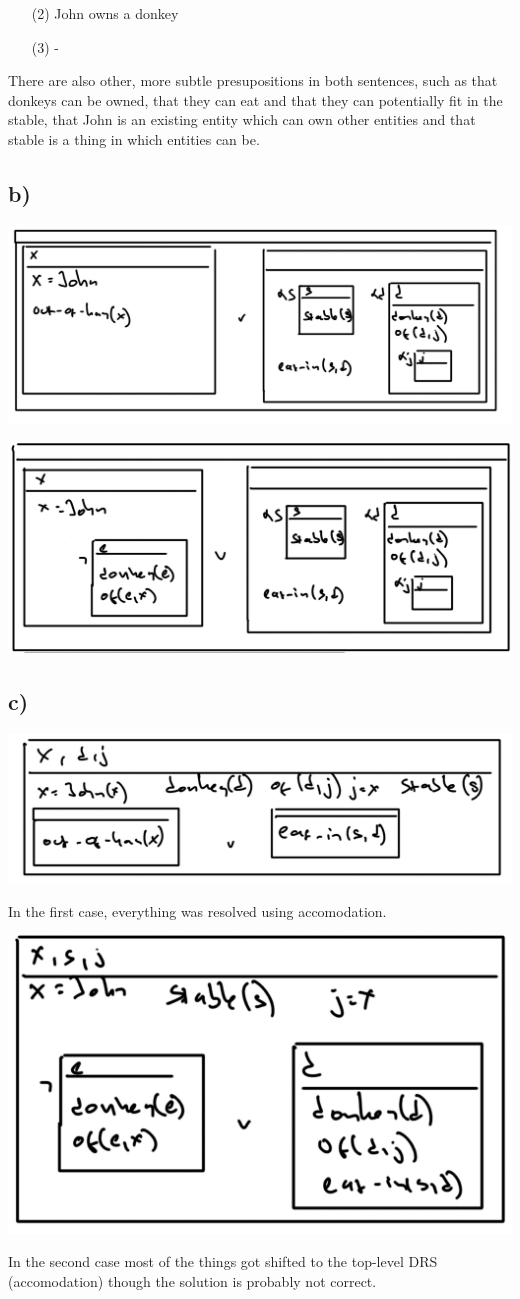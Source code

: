 \documentclass{article}
\begin{document}
\begin{itemize}
\item[(2)] John owns a donkey
\item[(3)] -
\end{itemize}

There are also other, more subtle presupositions in both sentences, such as that donkeys can be owned, that they can eat and that they can potentially fit in the stable, that John is an existing entity which can own other entities and that stable is a thing in which entities can be.

\subsection*{b)}

\includegraphics[width=0.75\linewidth]{dpr_2_a.png}

\includegraphics[width=0.75\linewidth]{dpr_3_a.png}

\subsection*{c)}

\includegraphics[width=0.75\linewidth]{dpr_2_b.png}

In the first case, everything was resolved using accomodation.

\includegraphics[width=0.75\linewidth]{dpr_3_b.png}

In the second case most of the things got shifted to the top-level DRS (accomodation) though the solution is probably not correct.
\end{document}
